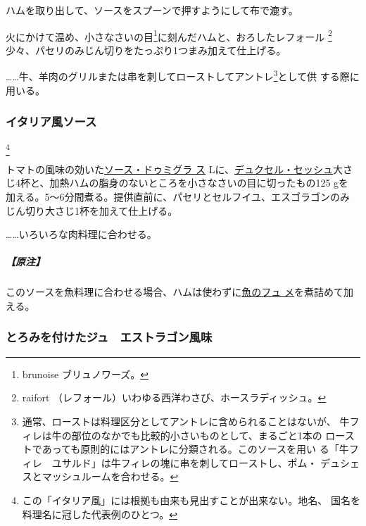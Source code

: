 \begin{recette}
ハムを取り出して、ソースをスプーンで押すようにして布で漉す。

火にかけて温め、小さなさいの目\footnote{brunoise ブリュノワーズ。}に刻んだハムと、おろしたレフォール
\footnote{raifort （レフォール）いわゆる西洋わさび、ホースラディッシュ。}少々、パセリのみじん切りをたっぷり1つまみ加えて仕上げる。

\ldots{}\ldots{}牛、羊肉のグリルまたは串を刺してローストしてアントレ\footnote{通常、ローストは料理区分としてアントレに含められることはないが、
  牛フィレは牛の部位のなかでも比較的小さいものとして、まるごと1本の
  ローストであっても原則的にはアントレに分類される。このソースを用い
  る「牛フィレ　ユサルド」は牛フィレの塊に串を刺してローストし、ポム・
  デュシェスとマッシュルームを合わせる。}として供 する際に用いる。

\hypertarget{sauce-italienne}{%
\subsubsection{イタリア風ソース}\label{sauce-italienne}}

\footnote{この「イタリア風」には根拠も由来も見出すことが出来ない。地名、
  国名を料理名に冠した代表例のひとつ。}


トマトの風味の効いた\protect\hyperlink{sauce-demi-glace}{ソース・ドゥミグラ
ス}\troisquarts{}
Lに、\protect\hyperlink{duxelles-seche}{デュクセル・セッシュ}大さ
じ4杯と、加熱ハムの脂身のないところを小さなさいの目に切ったもの125 gを
加える。5〜6分間煮る。提供直前に、パセリとセルフイユ、エスゴラゴンのみ
じん切り大さじ1杯を加えて仕上げる。

\ldots{}\ldots{}いろいろな肉料理に合わせる。

\hypertarget{nota-sauce-italienne}{%
\subparagraph{【原注】}\label{nota-sauce-italienne}}

このソースを魚料理に合わせる場合、ハムは使わずに\protect\hyperlink{fumet-de-poisson}{魚のフュ
メ}を煮詰めて加える。

\hypertarget{jus-lie-a-lestragon}{%
\subsubsection{とろみを付けたジュ　エストラゴン風味}\label{jus-lie-a-lestragon}}


\end{recette}
